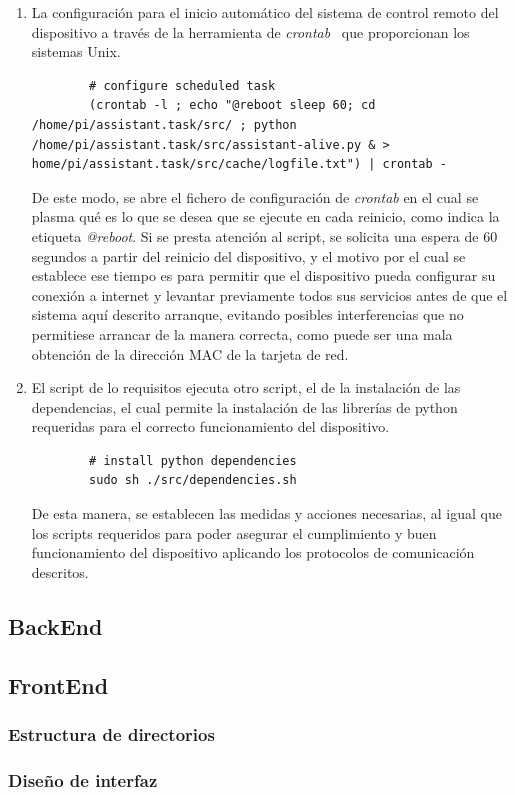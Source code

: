         \begin{enumerate}
            \item La configuración para el inicio automático del sistema de control remoto del dispositivo a través de la herramienta de \textit{crontab}~\cite{crontab} que proporcionan los sistemas Unix.
            
        \begin{lstlisting}
        # configure scheduled task
        (crontab -l ; echo "@reboot sleep 60; cd /home/pi/assistant.task/src/ ; python /home/pi/assistant.task/src/assistant-alive.py & > home/pi/assistant.task/src/cache/logfile.txt") | crontab -
        \end{lstlisting}
        
        De este modo, se abre el fichero de configuración de \textit{crontab} en el cual se plasma qué es lo que se desea que se ejecute en cada reinicio, como indica la etiqueta \textit{@reboot}.
        Si se presta atención al script, se solicita una espera de 60 segundos a partir del reinicio del dispositivo, y el motivo por el cual se establece ese tiempo es para permitir que el dispositivo pueda configurar su conexión a internet y levantar previamente todos sus servicios antes de que el sistema aquí descrito arranque, evitando posibles interferencias que no permitiese arrancar de la manera correcta, como puede ser una mala obtención de la dirección MAC de la tarjeta de red.
        
        \item El script de lo requisitos ejecuta otro script, el de la instalación de las dependencias, el cual permite la instalación de las librerías de python requeridas para el correcto funcionamiento del dispositivo.
        
        \begin{lstlisting}
        # install python dependencies
        sudo sh ./src/dependencies.sh
        \end{lstlisting}
        
        De esta manera, se establecen las medidas y acciones necesarias, al igual que los scripts requeridos para poder asegurar el cumplimiento y buen funcionamiento del dispositivo aplicando los protocolos de comunicación descritos.
        
        \end{enumerate}


\subsection{BackEnd}

    
\newpage
\subsection{FrontEnd}

    \subsubsection{Estructura de directorios}
    
    
    \subsubsection{ Diseño de interfaz }
    